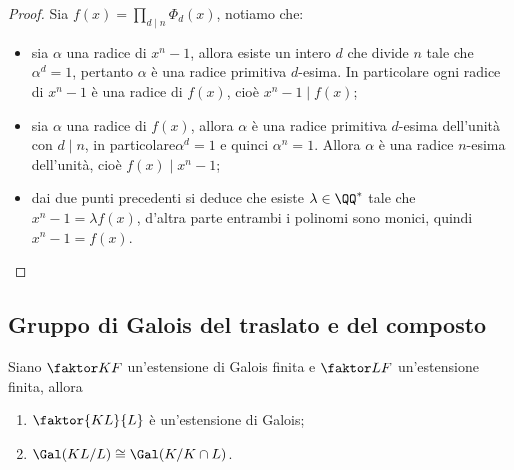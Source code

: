 \documentclass[11pt]{scrartcl}
\begin{document}
	\begin{proof}
		Sia $f(x) = \displaystyle\prod_{d \mid n}\Phi_d(x)$, notiamo che:
		\begin{itemize}
			\item sia $\alpha$ una radice di $x^n - 1$, allora esiste un intero $d$
			che divide $n$ tale che $\alpha^d = 1$, pertanto $\alpha$ è una radice primitiva
			$d$-esima. In particolare ogni radice di $x^n - 1$ è una radice di 
			$f(x)$, cioè $x^n - 1 \mid f(x)$;
			\item sia $\alpha$ una radice di $f(x)$, allora $\alpha$ è una radice
			primitiva $d$-esima dell'unità con $d\mid n$, in particolare$\alpha^d = 1$
			e quinci $\alpha^n = 1$. Allora $\alpha$ è una radice $n$-esima dell'unità,
			cioè $f(x) \mid x^n - 1$;
			\item dai due punti precedenti si deduce che esiste $\lambda \in \QQ^*$
			tale che $x^n - 1 = \lambda f(x)$, d'altra parte entrambi i polinomi
			sono monici, quindi $x^n - 1 = f(x)$.
		\end{itemize}
	\end{proof}
	
	\newpage
	
	\subsection{Gruppo di Galois del traslato e del composto}
	
	\begin{proposition}
		\label{prop3.13}
		Siano $\faktor K F$ un'estensione di Galois finita e $\faktor L F$ un'estensione
		finita, allora
		\begin{enumerate}[(1)]
			\item $\faktor{KL}{L}$ è un'estensione di Galois;
			\item $\Gal(KL/L) \cong \Gal(K/K\cap L)$.
		\end{enumerate}
	\end{proposition}
	
\end{document}
